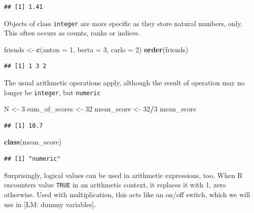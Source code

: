 \documentclass[]{svmono}
\newenvironment{Shaded}{\begin{snugshade}}{\end{snugshade}}
\newcommand{\KeywordTok}[1]{\textcolor[rgb]{0.13,0.29,0.53}{\textbf{#1}}}
\newcommand{\DataTypeTok}[1]{\textcolor[rgb]{0.13,0.29,0.53}{#1}}
\newcommand{\DecValTok}[1]{\textcolor[rgb]{0.00,0.00,0.81}{#1}}
\newcommand{\StringTok}[1]{\textcolor[rgb]{0.31,0.60,0.02}{#1}}
\newcommand{\OperatorTok}[1]{\textcolor[rgb]{0.81,0.36,0.00}{\textbf{#1}}}
\newcommand{\NormalTok}[1]{#1}
\begin{document}
\begin{verbatim}
## [1] 1.41
\end{verbatim}

Objects of class \texttt{integer} are more specific as they store
natural numbers, only. This often occurs as counts, ranks or indices.

\begin{Shaded}
\begin{Highlighting}[]
\NormalTok{friends <-}\StringTok{ }\KeywordTok{c}\NormalTok{(}\DataTypeTok{anton =} \DecValTok{1}\NormalTok{, }
             \DataTypeTok{berta =} \DecValTok{3}\NormalTok{, }
             \DataTypeTok{carlo =} \DecValTok{2}\NormalTok{)}
\KeywordTok{order}\NormalTok{(friends)}
\end{Highlighting}
\end{Shaded}

\begin{verbatim}
## [1] 1 3 2
\end{verbatim}

The usual arithmetic operations apply, although the result of operation
may no longer be \texttt{integer}, but \texttt{numeric}

\begin{Shaded}
\begin{Highlighting}[]
\NormalTok{N <-}\StringTok{ }\DecValTok{3}
\NormalTok{sum_of_scores <-}\StringTok{ }\DecValTok{32}
\NormalTok{mean_score <-}\StringTok{ }\DecValTok{32}\OperatorTok{/}\DecValTok{3}
\NormalTok{mean_score}
\end{Highlighting}
\end{Shaded}

\begin{verbatim}
## [1] 10.7
\end{verbatim}

\begin{Shaded}
\begin{Highlighting}[]
\KeywordTok{class}\NormalTok{(mean_score)}
\end{Highlighting}
\end{Shaded}

\begin{verbatim}
## [1] "numeric"
\end{verbatim}

Surprisingly, logical values can be used in arithmetic expressions, too.
When R encounters value \texttt{TRUE} in an arithmetic context, it
replaces it with 1, zero otherwise. Used with multiplication, this acts
like an on/off switch, which we will use in {[}LM: dummy variables{]}.
\end{document}
